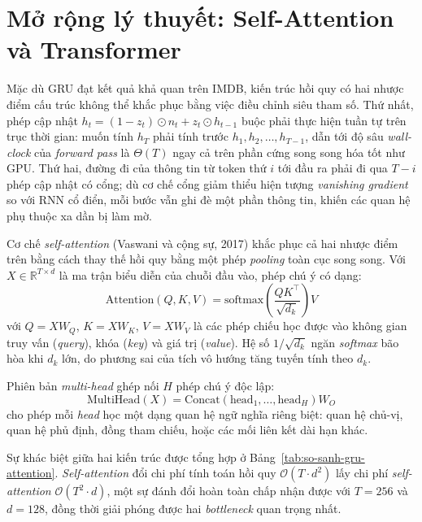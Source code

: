 \section{Mở rộng lý thuyết: Self-Attention và Transformer}

Mặc dù GRU đạt kết quả khả quan trên IMDB, kiến trúc hồi quy có hai nhược điểm cấu trúc không thể khắc phục bằng việc điều chỉnh siêu tham số. Thứ nhất, phép cập nhật $h_t = (1 - z_t) \odot n_t + z_t \odot h_{t-1}$ buộc phải thực hiện tuần tự trên trục thời gian: muốn tính $h_T$ phải tính trước $h_1, h_2, \dots, h_{T-1}$, dẫn tới độ sâu \textit{wall-clock} của \textit{forward pass} là $\Theta(T)$ ngay cả trên phần cứng song song hóa tốt như GPU. Thứ hai, đường đi của thông tin từ token thứ $i$ tới đầu ra phải đi qua $T-i$ phép cập nhật có cổng; dù cơ chế cổng giảm thiểu hiện tượng \textit{vanishing gradient} so với RNN cổ điển, mỗi bước vẫn ghi đè một phần thông tin, khiến các quan hệ phụ thuộc xa dần bị làm mờ.

Cơ chế \textit{self-attention} (Vaswani và cộng sự, 2017) khắc phục cả hai nhược điểm trên bằng cách thay thế hồi quy bằng một phép \textit{pooling} toàn cục song song. Với $X \in \mathbb{R}^{T \times d}$ là ma trận biểu diễn của chuỗi đầu vào, phép chú ý có dạng:
\begin{equation}
\text{Attention}(Q, K, V) = \text{softmax}\left( \frac{Q K^\top}{\sqrt{d_k}} \right) V
\end{equation}
với $Q = X W_Q$, $K = X W_K$, $V = X W_V$ là các phép chiếu học được vào không gian truy vấn (\textit{query}), khóa (\textit{key}) và giá trị (\textit{value}). Hệ số $1/\sqrt{d_k}$ ngăn \textit{softmax} bão hòa khi $d_k$ lớn, do phương sai của tích vô hướng tăng tuyến tính theo $d_k$. 

Phiên bản \textit{multi-head} ghép nối $H$ phép chú ý độc lập:
\begin{equation}
\text{MultiHead}(X) = \text{Concat}(\text{head}_1, \dots, \text{head}_H) W_O
\end{equation}
cho phép mỗi \textit{head} học một dạng quan hệ ngữ nghĩa riêng biệt: quan hệ chủ-vị, quan hệ phủ định, đồng tham chiếu, hoặc các mối liên kết dài hạn khác.

Sự khác biệt giữa hai kiến trúc được tổng hợp ở Bảng~\ref{tab:so-sanh-gru-attention}. \textit{Self-attention} đổi chi phí tính toán hồi quy $\mathcal{O}(T \cdot d^2)$ lấy chi phí \textit{self-attention} $\mathcal{O}(T^2 \cdot d)$, một sự đánh đổi hoàn toàn chấp nhận được với $T=256$ và $d=128$, đồng thời giải phóng được hai \textit{bottleneck} quan trọng nhất.

